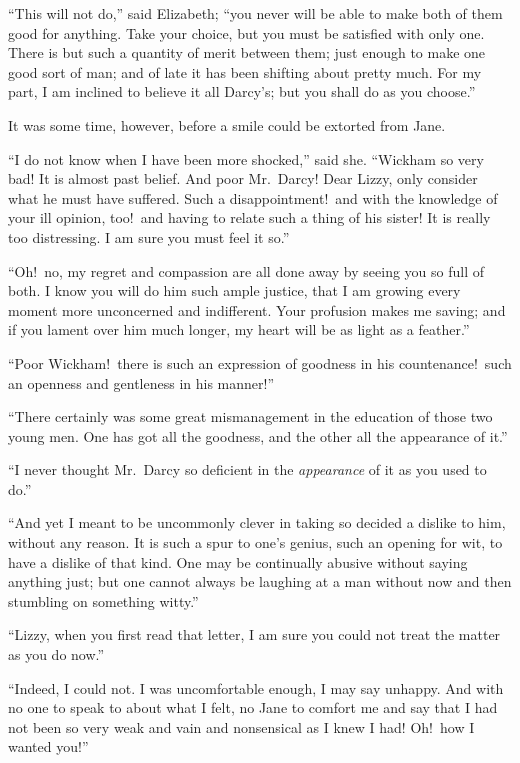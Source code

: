 \documentclass[12pt,english]{book}
\begin{document}
{}``This will not do,'' said Elizabeth; {}``you never will be able
to make both of them good for anything. Take your choice, but you
must be satisfied with only one. There is but such a quantity of merit
between them; just enough to make one good sort of man; and of late
it has been shifting about pretty much. For my part, I am inclined
to believe it all Darcy's; but you shall do as you choose.''

It was some time, however, before a smile could be extorted from Jane.

{}``I do not know when I have been more shocked,'' said she. {}``Wickham
so very bad! It is almost past belief. And poor Mr.\ Darcy! Dear
Lizzy, only consider what he must have suffered. Such a disappointment!\ and
with the knowledge of your ill opinion, too!\ and having to relate
such a thing of his sister! It is really too distressing. I am sure
you must feel it so.''

{}``Oh!\ no, my regret and compassion are all done away by seeing
you so full of both. I know you will do him such ample justice, that
I am growing every moment more unconcerned and indifferent. Your profusion
makes me saving; and if you lament over him much longer, my heart
will be as light as a feather.''

{}``Poor Wickham!\ there is such an expression of goodness in his
countenance!\ such an openness and gentleness in his manner!''\ 

{}``There certainly was some great mismanagement in the education
of those two young men. One has got all the goodness, and the other
all the appearance of it.''

{}``I never thought Mr.\ Darcy so deficient in the \textit{appearance}
of it as you used to do.''

{}``And yet I meant to be uncommonly clever in taking so decided
a dislike to him, without any reason. It is such a spur to one's genius,
such an opening for wit, to have a dislike of that kind. One may be
continually abusive without saying anything just; but one cannot always
be laughing at a man without now and then stumbling on something witty.''

{}``Lizzy, when you first read that letter, I am sure you could not
treat the matter as you do now.''

{}``Indeed, I could not. I was uncomfortable enough, I may say unhappy.
And with no one to speak to about what I felt, no Jane to comfort
me and say that I had not been so very weak and vain and nonsensical
as I knew I had! Oh!\ how I wanted you!''\ 
\end{document}
